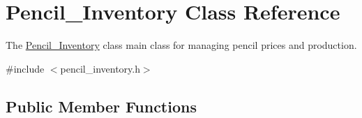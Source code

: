 \hypertarget{classPencil__Inventory}{}\section{Pencil\+\_\+\+Inventory Class Reference}
\label{classPencil__Inventory}


The \hyperlink{classPencil__Inventory}{Pencil\+\_\+\+Inventory} class main class for managing pencil prices and production.  




{\ttfamily \#include $<$pencil\+\_\+inventory.\+h$>$}

\subsection*{Public Member Functions}
